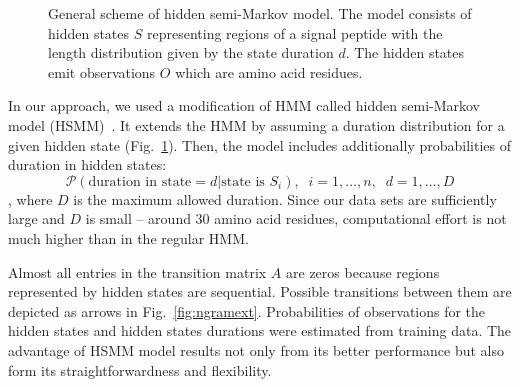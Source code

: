 \documentclass[10pt,letterpaper]{article}
\begin{document}
\begin{figure}[h]
\caption{General scheme of hidden semi-Markov model. The model consists of hidden states $S$ representing regions of a signal peptide with the length distribution given by the state duration $d$. The hidden states emit observations $O$ which are amino acid residues.}
\label{fig:hsmm}
\end{figure}

In our approach, we used a modification of HMM called hidden semi-Markov model (HSMM)~\cite{Yu2010215}. It extends the HMM by assuming a duration distribution for a given hidden state (Fig.~\ref{fig:hsmm}). Then, the model includes additionally probabilities of duration in hidden states: 
$$\mathcal{P}(\text{duration in state} = d | \text{state is } S_i), \;\; i = 1, \dots, n, \;\; d = 1, \dots, D$$,
where $D$ is the maximum allowed duration.
Since our data sets are sufficiently large and $D$ is small -- around 30 amino acid residues, computational effort is not much higher than in the regular HMM. 

Almost all entries in the transition matrix $A$ are zeros because regions represented by hidden states are sequential. Possible transitions between them are depicted as arrows in Fig.~\ref{fig:ngramext}. Probabilities of observations for the hidden states and hidden states durations were estimated from training data. The advantage of HSMM model results not only from its better performance but also form its straightforwardness and flexibility. 
\end{document}
